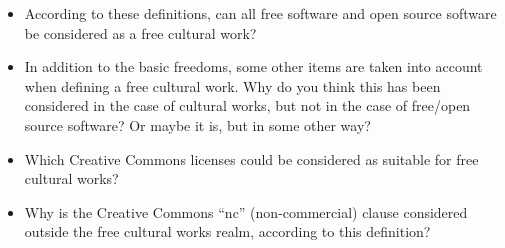 \documentclass[a4paper]{article}
\begin{document}
\begin{itemize}
\item According to these definitions, can all free software and open source software be considered as a free cultural work?
\item In addition to the basic freedoms, some other items are taken into account when defining a free cultural work. Why do you think this has been considered in the case of cultural works, but not in the case of free/open source software? Or maybe it is, but in some other way?
\item Which Creative Commons licenses could be considered as suitable for free cultural works?
\item Why is the Creative Commons ``nc'' (non-commercial) clause considered outside the free cultural works realm, according to this definition?
\end{itemize}
\end{document}
